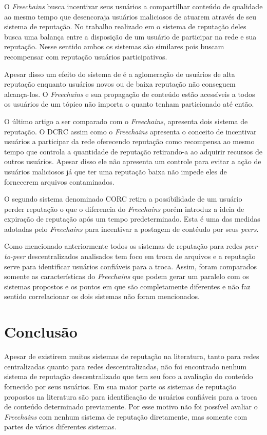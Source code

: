 \documentclass[12pt]{article}
\newcommand{\FC} {\emph{Freechains}\xspace}
\newcommand{\PtoP} {\emph{peer-to-peer}\xspace}
\begin{document}
O \FC busca incentivar seus usuários a compartilhar conteúdo de qualidade ao mesmo tempo que desencoraja usuários maliciosos de atuarem através de seu sistema de reputação. No trabalho realizado em \cite{mortazavi2006cumulative} o sistema de reputação deles busca uma balança entre a disposição de um usuário de participar na rede e sua reputação. Nesse sentido ambos os sistemas são similares pois buscam recompensar com reputação usuários participativos.

Apesar disso um efeito do sistema de \cite{mortazavi2006cumulative} é a aglomeração de usuários de alta reputação enquanto usuários novos ou de baixa reputação não conseguem alcança-los. O \FC e sua propagação de conteúdo estão acessíveis a todos os usuários de um tópico não importa o quanto tenham particionado até então.

O último artigo a ser comparado com o \FC, \cite{gupta2003reputation} apresenta dois sistema de reputação. O DCRC assim como o \FC apresenta o conceito de incentivar usuários a participar da rede oferecendo reputação como recompensa ao mesmo tempo que controla a quantidade de reputação retirando-a ao adquirir recursos de outros usuários. Apesar disso ele não apresenta um controle para evitar a ação de usuários maliciosos já que ter uma reputação baixa não impede eles de fornecerem arquivos contaminados.

O segundo sistema denominado CORC retira a possibilidade de um usuário perder reputação o que o diferencia do \FC porém introduz a ideia de expiração de reputação após um tempo predeterminado. Esta  é uma das medidas adotadas pelo \FC para incentivar a postagem de contéudo por seus \emph{peers}.

Como mencionado anteriormente todos os sistemas de reputação para redes \PtoP descentralizados analisados tem foco em troca de arquivos e a reputação serve para identificar usuários confiáveis para a troca. Assim, foram comparados somente as características do \FC que podem gerar um paralelo com os sistemas propostos e os pontos em que são completamente diferentes e não faz sentido correlacionar os dois sistemas não foram mencionados.  

\section{Conclusão}\label{sec:conclusao}

Apesar de existirem muitos sistemas de reputação na literatura, tanto para redes centralizadas quanto para redes descentralizadas, não foi encontrado nenhum sistema de reputação descentralizado que tem seu foco a avaliação do conteúdo fornecido por seus usuários. Em sua maior parte os sistemas de reputação propostos na literatura são para identificação de usuários confiáveis para a troca de conteúdo determinado previamente. Por esse motivo não foi possível avaliar o \FC com nenhum sistema de reputação diretamente, mas somente com partes de vários diferentes sistemas.
\end{document}

